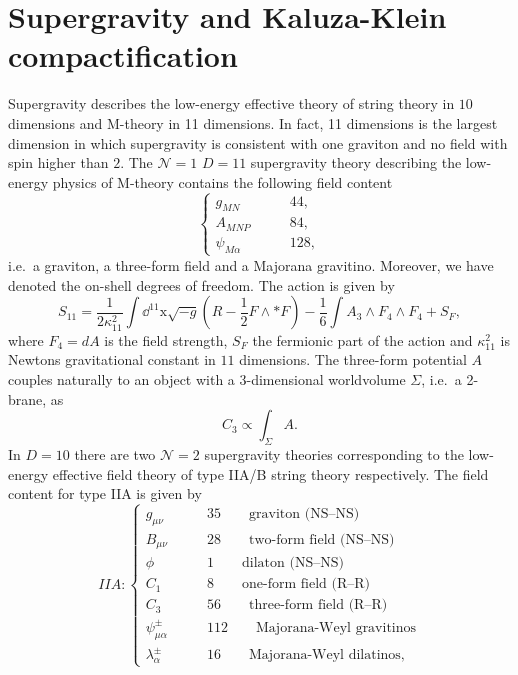 \section{Supergravity and Kaluza-Klein compactification}
Supergravity describes the low-energy effective theory of string theory in $10$ dimensions and M-theory in 11 dimensions. In fact, 11 dimensions is the largest dimension in which supergravity is consistent with one graviton and no field with spin higher than $2$. The $\mathcal{N}=1$ $D=11$ supergravity theory describing the low-energy physics of M-theory contains the following field content 
\begin{equation}
    \begin{cases}
        g_{MN} \qquad &44,\\
        A_{MNP} \qquad &84,\\
        \psi_{M\alpha} \qquad &128,
    \end{cases}
\end{equation}
i.e.\ a graviton, a three-form field and a Majorana gravitino. Moreover, we have denoted the on-shell degrees of freedom. The action is given by 
\begin{equation}
    S_{11} = \frac{1}{2\kappa_{11}^2}\int\dd^{11}\mathrm{x}\sqrt{-g}\left(R-\frac{1}{2}F\wedge *F\right)-\frac{1}{6}\int A_3 \wedge F_{4}\wedge F_{4}+S_F, 
\end{equation}
where $F_{4}=dA$ is the field strength, $S_F$ the fermionic part of the action and $\kappa_{11}^2$ is Newtons gravitational constant in $11$ dimensions. The three-form potential $A$ couples naturally to an object with a 3-dimensional worldvolume $\Sigma$, i.e.\ a 2-brane, as 
\begin{equation}
    C_3 \propto \int_{\Sigma}A.
\end{equation}
In $D=10$ there are two $\mathcal{N}=2$ supergravity theories corresponding to the low-energy effective field theory of type IIA/B string theory respectively. The field content for type IIA is given by 
\begin{equation*}
    IIA: \begin{cases}
                g_{\mu\nu} \qquad &35 \qquad \text{graviton (NS--NS)}\\
                B_{\mu\nu} \qquad &28 \qquad  \text{two-form field (NS--NS)}\\
                \phi\qquad &1 \qquad  \text{dilaton (NS--NS)}\\
                C_{1}\qquad &8 \qquad  \text{one-form field (R--R)}\\
                C_{3}\qquad &56 \qquad  \text{three-form field  (R--R)}\\
                \psi_{\mu\alpha}^\pm\qquad &112\qquad \text{Majorana-Weyl gravitinos}\\
                \lambda_\alpha^\pm \qquad &16\qquad \text{Majorana-Weyl dilatinos},
          \end{cases}
\end{equation*}
